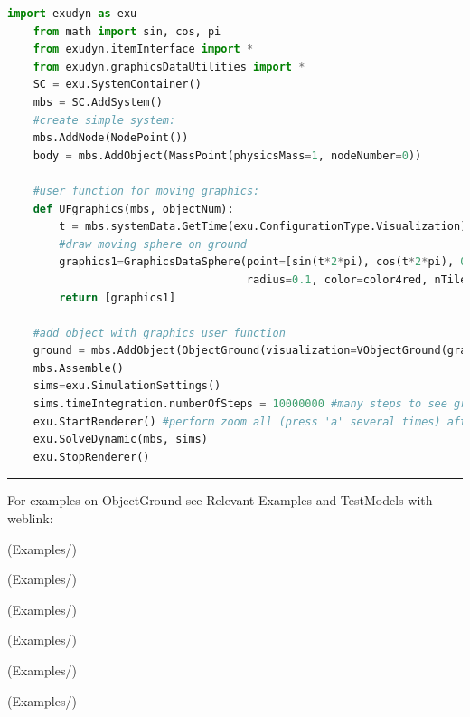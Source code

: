     \begin{lstlisting}[language=Python]
    import exudyn as exu
    from math import sin, cos, pi
    from exudyn.itemInterface import *
    from exudyn.graphicsDataUtilities import *
    SC = exu.SystemContainer()
    mbs = SC.AddSystem()
    #create simple system:
    mbs.AddNode(NodePoint())
    body = mbs.AddObject(MassPoint(physicsMass=1, nodeNumber=0))
    
    #user function for moving graphics:
    def UFgraphics(mbs, objectNum):
        t = mbs.systemData.GetTime(exu.ConfigurationType.Visualization) #get time if needed
        #draw moving sphere on ground
        graphics1=GraphicsDataSphere(point=[sin(t*2*pi), cos(t*2*pi), 0], 
                                     radius=0.1, color=color4red, nTiles=32)
        return [graphics1] 

    #add object with graphics user function
    ground = mbs.AddObject(ObjectGround(visualization=VObjectGround(graphicsDataUserFunction=UFgraphics)))
    mbs.Assemble()
    sims=exu.SimulationSettings()
    sims.timeIntegration.numberOfSteps = 10000000 #many steps to see graphics
    exu.StartRenderer() #perform zoom all (press 'a' several times) after startup to see the sphere
    exu.SolveDynamic(mbs, sims)
    exu.StopRenderer()
    \end{lstlisting}
\vspace{6pt}\par\noindent\rule{\textwidth}{0.4pt}
%
\noindent For examples on ObjectGround see Relevant Examples and TestModels with weblink:
\bi
\item {} (Examples/)
\item {} (Examples/)
\item {} (Examples/)
\item {} (Examples/)
\item {} (Examples/)
\item {} (Examples/)
